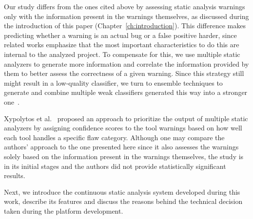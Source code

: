 Our study differs from the ones cited above by assessing static analysis
warnings only with the information present in the warnings themselves, as
discussed during the introduction of this paper
(Chapter~\ref{ch:introduction}).  This difference makes predicting whether a warning is
an actual bug or a false positive harder, since related works emphasize that
the most important characteristics to do this are internal to the analyzed
project. To compensate for this, we use multiple static analyzers to generate
more information and correlate the information provided by them to better
assess the correctness of a given warning.  Since this strategy still might
result in a low-quality classifier, we turn to ensemble techniques to generate
and combine multiple weak classifiers generated this way into a stronger
one~\cite{aima}.

Xypolytos et al.~\cite{xypolytos2017framework} proposed an approach to
prioritize the output of multiple static analyzers by assigning confidence
scores to the tool warnings based on how well each tool handles a specific flaw
category. Although one may compare the authors' approach to the one presented here
since it also assesses the warnings solely based on the information present in the
warnings themselves, the study is in its initial stages and the authors did not
provide statistically significant results.

Next, we introduce the continuous static analysis system developed during this
work, describe its features and discuss the reasons behind the technical
decision taken during the platform development.

